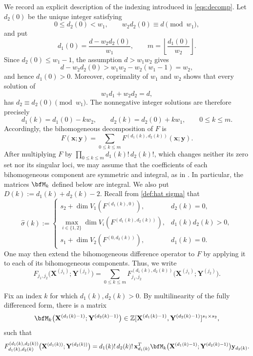 \documentclass[12pt,reqno]{amsart}
\theoremstyle{definition}
\theoremstyle{remark}
\numberwithin{equation}{section}
\def\bfx{{\mathbf x}}
\def\bfy{{\mathbf y}}
\def\bfX{{\mathbf X}}
\def\bfY{{\mathbf Y}}
\def\Z{{\mathbb Z}}\def\Q{{\mathbb Q}}
\begin{document}
We record an explicit description of the indexing introduced in
\eqref{eqs:decomp}. Let $d_2(0)$ be the unique integer satisfying
\[
    0\leq d_2(0)<w_1,
    \qquad
    w_2d_2(0)\equiv d\pmod{w_1},
\]
and put
\[
    d_1(0)=\frac{d-w_2d_2(0)}{w_1},
    \qquad
    m=\left\lfloor\frac{d_1(0)}{w_2}\right\rfloor.
\]
Since $d_2(0)\leq w_1-1$, the assumption $d>w_1w_2$ gives
\[
    d-w_2d_2(0)>w_1w_2-w_2(w_1-1)=w_2,
\]
and hence $d_1(0)>0$.  Moreover, coprimality of $w_1$ and $w_2$ shows
that every solution of
\[
    w_1d_1+w_2d_2=d,
\]
has $d_2\equiv d_2(0)\pmod{w_1}$.  The nonnegative integer solutions
are therefore precisely
\[
    d_1(k)=d_1(0)-kw_2,
    \qquad
    d_2(k)=d_2(0)+kw_1,
    \qquad
    0\leq k\leq m.
\]
Accordingly, the bihomogeneous decomposition of $F$ is
\[
    F(\bfx;\bfy)
    =
    \sum_{0\leq k\leq m}
    F^{(d_1(k),d_2(k))}(\bfx;\bfy).
\]
After multiplying $F$ by
$\prod_{0\leq k\leq m}d_1(k)!\,d_2(k)!$, which changes neither its zero set
nor its singular loci, we may assume that the coefficients of each
bihomogeneous component are symmetric and integral, as in \cite[\S 2]{Schindler2014}.
In particular, the matrices $\bfM_k$ defined below are integral.
We also put $D(k):=d_1(k)+d_2(k)-2$. Recall from
\eqref{def:hat sigma} that
\[
\widehat{\sigma}(k):=
\begin{cases}
s_2+\dim V_1(F^{(d_1(k),0)}),&d_2(k)=0,\\[2mm]
\displaystyle\max_{i\in\{1,2\}}
\dim V_i(F^{(d_1(k),d_2(k))}),&d_1(k)d_2(k)>0,\\[2mm]
s_1+\dim V_2(F^{(0,d_2(k))}),&d_1(k)=0.
\end{cases}
\]
One may then extend the bihomogeneous difference operator to $F$ by applying it to each
of its bihomogeneous components. Thus, we write
\begin{equation}\label{def of weighted bihomogeneous differencing}
    F_{j_1,j_2}
    \bigl(\bfX^{(j_1)};\bfY^{(j_2)}\bigr)
    =
    \sum_{0\leq k\leq m}
    F^{(d_1(k),d_2(k))}_{j_1,j_2}
    \bigl(\bfX^{(j_1)};\bfY^{(j_2)}\bigr).
\end{equation}

Fix an index $k$ for which $d_1(k),d_2(k)>0$. By multilinearity of the
fully differenced form, there is a matrix
\[
    \bfM_k
    \bigl(
        \bfX^{(d_1(k)-1)};
        \bfY^{(d_2(k)-1)}
    \bigr)
    \in
    \Z[
        \bfX^{(d_1(k)-1)},
        \bfY^{(d_2(k)-1)}
    ]^{s_1\times s_2},
\]
such that
\begin{equation}\label{eqs: matrix def}
\begin{aligned}
F^{(d_1(k),d_2(k))}_{d_1(k),d_2(k)}
\bigl(
    \bfX^{(d_1(k))};
    \bfY^{(d_2(k))}
\bigr) =
d_1(k)!\,d_2(k)!\,
\bfx_{d_1(k)}^T
\bfM_k
\bigl(
    \bfX^{(d_1(k)-1)};
    \bfY^{(d_2(k)-1)}
\bigr)
\bfy_{d_2(k)}.
\end{aligned}
\end{equation}
\end{document}
